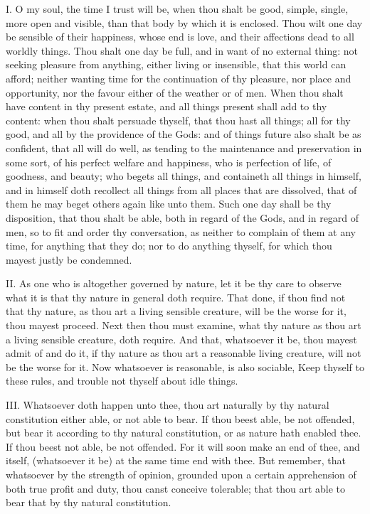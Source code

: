 
I. O my soul, the time I trust will be, when thou shalt be good, simple,
single, more open and visible, than that body by which it is enclosed.
Thou wilt one day be sensible of their happiness, whose end is love, and
their affections dead to all worldly things. Thou shalt one day be full,
and in want of no external thing: not seeking pleasure from anything,
either living or insensible, that this world can afford; neither wanting
time for the continuation of thy pleasure, nor place and opportunity, nor
the favour either of the weather or of men. When thou shalt have content
in thy present estate, and all things present shall add to thy content:
when thou shalt persuade thyself, that thou hast all things; all for thy
good, and all by the providence of the Gods: and of things future also
shalt be as confident, that all will do well, as tending to the
maintenance and preservation in some sort, of his perfect welfare and
happiness, who is perfection of life, of goodness, and beauty; who begets
all things, and containeth all things in himself, and in himself doth
recollect all things from all places that are dissolved, that of them he
may beget others again like unto them. Such one day shall be thy
disposition, that thou shalt be able, both in regard of the Gods, and in
regard of men, so to fit and order thy conversation, as neither to
complain of them at any time, for anything that they do; nor to do
anything thyself, for which thou mayest justly be condemned.

II. As one who is altogether governed by nature, let it be thy care to
observe what it is that thy nature in general doth require. That done, if
thou find not that thy nature, as thou art a living sensible creature,
will be the worse for it, thou mayest proceed. Next then thou must
examine, what thy nature as thou art a living sensible creature, doth
require. And that, whatsoever it be, thou mayest admit of and do it, if
thy nature as thou art a reasonable living creature, will not be the worse
for it. Now whatsoever is reasonable, is also sociable, Keep thyself to
these rules, and trouble not thyself about idle things.

III. Whatsoever doth happen unto thee, thou art naturally by thy natural
constitution either able, or not able to bear. If thou beest able, be not
offended, but bear it according to thy natural constitution, or as nature
hath enabled thee. If thou beest not able, be not offended. For it will
soon make an end of thee, and itself, (whatsoever it be) at the same time
end with thee. But remember, that whatsoever by the strength of opinion,
grounded upon a certain apprehension of both true profit and duty, thou
canst conceive tolerable; that thou art able to bear that by thy natural
constitution.

